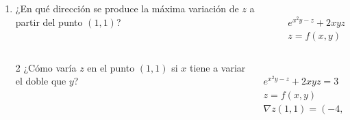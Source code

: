\documentclass[aspectratio=149,10pt,xcolor=dvipsnames,t]{beamer}
\begin{document}
\begin{frame}
\begin{columns}
\begin{column}[T]{0.7\textwidth}
\begin{enumerate}
\item ¿En qué dirección se produce la máxima variación de $z$ a partir del punto $(1,1)$?
\end{enumerate}
\end{column}
\begin{column}[T]{0.3\textwidth}
\\
$e^{x^2y-z}+2xyz=3$\\
$z=f(x,y)$
\end{column}
\end{columns}
\end{frame}


\begin{frame}
\begin{columns}
\begin{column}[T]{0.7\textwidth}
\begin{enumerate}
\item[2] ¿Cómo varía $z$ en el punto $(1,1)$ si $x$ tiene a variar el doble que $y$?
\end{enumerate}
\end{column}
\begin{column}[T]{0.3\textwidth}
\\
$e^{x^2y-z}+2xyz=3$\\
$z=f(x,y)$\\
$\nabla z(1,1)=(-4,-3)$
\end{column}
\end{columns}
\end{frame}
\end{document}

